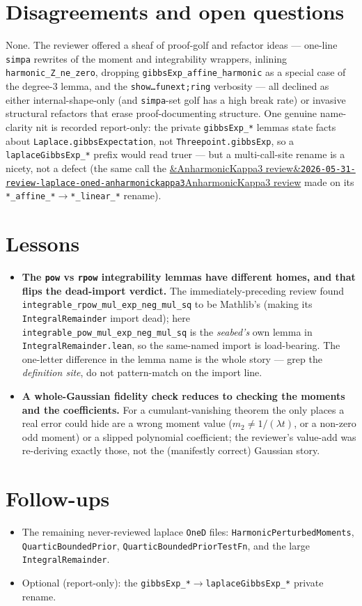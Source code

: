 \documentclass[11pt]{article}
\newcommand{\reviewref}[2][]{\href{https://therisensea.org/reviews/#2/}{\ifx&#1&\texttt{#2}\else#1\fi}}
\begin{document}
\section{Disagreements and open questions}
None. The reviewer offered a sheaf of proof-golf and refactor ideas --- one-line \texttt{simpa}
rewrites of the moment and integrability wrappers, inlining \texttt{harmonic\_Z\_ne\_zero}, dropping
\texttt{gibbsExp\_affine\_harmonic} as a special case of the degree-$3$ lemma, and the
\texttt{show\dots funext;ring} verbosity --- all declined as either internal-shape-only (and
\texttt{simpa}-set golf has a high break rate) or invasive structural refactors that erase
proof-documenting structure. One genuine name-clarity nit is recorded report-only: the private
\texttt{gibbsExp\_*} lemmas state facts about \texttt{Laplace.gibbsExpectation}, not
\texttt{Threepoint.gibbsExp}, so a \texttt{laplaceGibbsExp\_*} prefix would read truer --- but a
multi-call-site rename is a nicety, not a defect (the same call the
\reviewref[AnharmonicKappa3 review]{2026-05-31-review-laplace-oned-anharmonickappa3} made on its
\texttt{*\_affine\_*}$\to$\texttt{*\_linear\_*} rename).

\section{Lessons}
\begin{itemize}[noitemsep]
  \item \textbf{The \texttt{pow} vs \texttt{rpow} integrability lemmas have different homes, and that
    flips the dead-import verdict.} The immediately-preceding review found
    \texttt{integrable\_rpow\_mul\_exp\_neg\_mul\_sq} to be Mathlib's (making its
    \texttt{IntegralRemainder} import dead); here \texttt{integrable\_pow\_mul\_exp\_neg\_mul\_sq} is
    the \emph{seabed's} own lemma in \texttt{IntegralRemainder.lean}, so the same-named import is
    load-bearing. The one-letter difference in the lemma name is the whole story --- grep the
    \emph{definition site}, do not pattern-match on the import line.
  \item \textbf{A whole-Gaussian fidelity check reduces to checking the moments and the coefficients.}
    For a cumulant-vanishing theorem the only places a real error could hide are a wrong moment value
    ($m_2\ne1/(\lambda t)$, or a non-zero odd moment) or a slipped polynomial coefficient; the
    reviewer's value-add was re-deriving exactly those, not the (manifestly correct) Gaussian story.
\end{itemize}

\section{Follow-ups}
\begin{itemize}[noitemsep]
  \item The remaining never-reviewed laplace \texttt{OneD} files:
    \texttt{HarmonicPerturbedMoments}, \texttt{QuarticBoundedPrior},
    \texttt{QuarticBoundedPriorTestFn}, and the large \texttt{IntegralRemainder}.
  \item Optional (report-only): the \texttt{gibbsExp\_*}$\to$\texttt{laplaceGibbsExp\_*} private rename.
\end{itemize}
\end{document}

